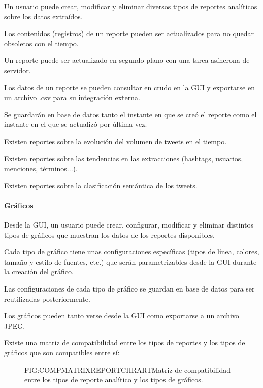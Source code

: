 \begin{functional}
\item Un usuario puede crear, modificar y eliminar diversos tipos de reportes analíticos sobre los datos extraídos.
\item Los contenidos (registros) de un reporte pueden ser actualizados para no quedar obsoletos con el tiempo.
\item Un reporte puede ser actualizado en segundo plano con una tarea asíncrona de servidor.
\item Los datos de un reporte se pueden consultar en crudo en la GUI y exportarse en un archivo .csv para su integración externa.
\item Se guardarán en base de datos tanto el instante en que se creó el reporte como el instante en el que se actualizó por última vez.
\item Existen reportes sobre la evolución del volumen de tweets en el tiempo. 
\item Existen reportes sobre las tendencias en las extracciones (hashtags, usuarios, menciones, términos...).
\item Existen reportes sobre la clasificación semántica de los tweets.
\paragraph{Gráficos}
\item Desde la GUI, un usuario puede crear, configurar, modificar y eliminar distintos tipos de gráficos que muestran los datos de los reportes disponibles.
\item Cada tipo de gráfico tiene unas configuraciones específicas (tipos de línea, colores, tamaño y estilo de fuentes, etc.) que serán parametrizables desde la GUI durante la creación del gráfico. 
\item Las configuraciones de cada tipo de gráfico se guardan en base de datos para ser reutilizadas posteriormente.
\item Los gráficos pueden tanto verse desde la GUI como exportarse a un archivo JPEG.
\item Existe una matriz de compatibilidad entre los tipos de reportes y los tipos de gráficos que son compatibles entre sí:
\begin{figure}[Matriz de compatibilidad reporte-gráfico]{FIG:COMPMATRIXREPORTCHRART}{Matriz de compatibilidad entre los tipos de reporte analítico y los tipos de gráficos.}
\end{figure}

\end{functional}
